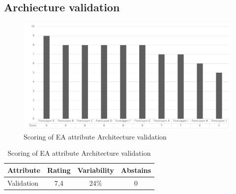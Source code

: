 \subsection{Archiecture validation}
\begin{figure}[H]
	\centering
	\includegraphics[width=0.9\linewidth]{images/scoreeavalidation}
	\caption[Scoring of EA attribute Architecture validation]{Scoring of EA attribute Architecture validation}
	\label{fig:appscoringeavalidation}
\end{figure}
\begin{table}[H]
	\centering
	\begin{tabular}{p{}ccc}
		\toprule
		\textbf{Attribute} & \textbf{Rating} & \textbf{Variability} & \textbf{Abstains} \\
		\midrule
		Validation & 7,4 & 24\% & 0 \\%
		\bottomrule
	\end{tabular}%
	\caption[Scoring of EA attribute Architecture validation]{Scoring of EA attribute Architecture validation}
	\label{tab:appscoringeavalidation}%
\end{table}%
\newpage
